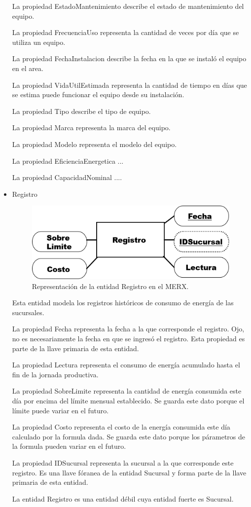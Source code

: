 \documentclass{article}
\begin{document}
\begin{itemize}
La propiedad EstadoMantenimiento describe el estado de mantenimiento del equipo.

La propiedad FrecuenciaUso representa la cantidad de veces por día que se utiliza un equipo.

La propiedad FechaInstalacion describe la fecha en la que se instaló el equipo en el area.

La propiedad VidaUtilEstimada representa la cantidad de tiempo en días que se estima puede funcionar el equipo desde su instalación.

La propiedad Tipo describe el tipo de equipo.

La propiedad Marca representa la marca del equipo.

La propiedad Modelo representa el modelo del equipo.

La propiedad EficienciaEnergetica ...

La propiedad CapacidadNominal ....

\item Registro

\begin{figure}
\includegraphics[scale=0.5]{Imagenes/Informe1/EntidadRegistro.png}
\caption{Representación de la entidad Registro en el MERX.}
\label{entidadRegistro}
\end{figure}

Esta entidad modela los registros históricos de consumo de energía de las sucursales.

La propiedad Fecha representa la fecha a la que corresponde el registro. Ojo, no es necesariamente la fecha en que se ingresó el registro. Esta propiedad es parte de la llave primaria de esta entidad.

La propiedad Lectura representa el consumo de energía acumulado hasta el fin de la jornada productiva.

La propiedad SobreLimite representa la cantidad de energía consumida este día por encima del límite mensual establecido. Se guarda este dato porque el límite puede variar en el futuro.

La propiedad Costo representa el costo de la energía consumida este día calculado por la formula dada. Se guarda este dato porque los párametros de la formula pueden variar en el futuro.

La propiedad IDSucursal representa la sucursal a la que corresponde este registro. Es una llave fóranea de la entidad Sucursal y forma parte de la llave primaria de esta entidad.

La entidad Registro es una entidad débil cuya entidad fuerte es Sucursal.
\end{itemize}
\end{document}
